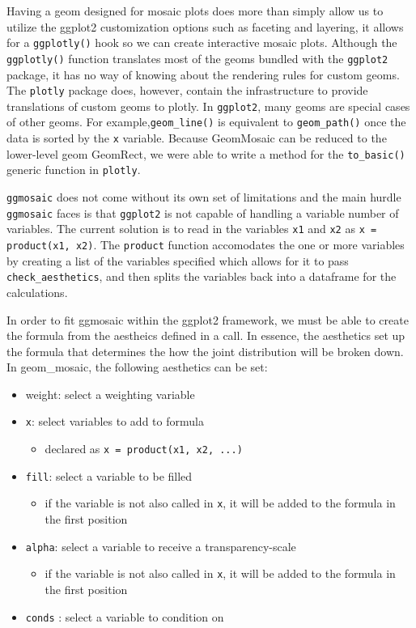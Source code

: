 Having a geom designed for mosaic plots does more than simply allow us
to utilize the ggplot2 customization options such as faceting and
layering, it allows for a \texttt{ggplotly()} hook so we can create
interactive mosaic plots. Although the \texttt{ggplotly()} function
translates most of the geoms bundled with the \texttt{ggplot2} package,
it has no way of knowing about the rendering rules for custom geoms. The
\texttt{plotly} package does, however, contain the infrastructure to
provide translations of custom geoms to plotly. In \texttt{ggplot2},
many geoms are special cases of other geoms. For
example,\texttt{geom\_line()} is equivalent to \texttt{geom\_path()}
once the data is sorted by the \texttt{x} variable. \citet{carson}
Because GeomMosaic can be reduced to the lower-level geom GeomRect, we
were able to write a method for the \texttt{to\_basic()} generic
function in \texttt{plotly}.

\texttt{ggmosaic} does not come without its own set of limitations and
the main hurdle \texttt{ggmosaic} faces is that \texttt{ggplot2} is not
capable of handling a variable number of variables. The current solution
is to read in the variables \texttt{x1} and \texttt{x2} as
\texttt{x = product(x1, x2)}. The \texttt{product} function accomodates
the one or more variables by creating a list of the variables specified
which allows for it to pass \texttt{check\_aesthetics}, and then splits
the variables back into a dataframe for the calculations.

In order to fit ggmosaic within the ggplot2 framework, we must be able
to create the formula from the aestheics defined in a call. In essence,
the aesthetics set up the formula that determines the how the joint
distribution will be broken down. In geom\_mosaic, the following
aesthetics can be set:

\begin{itemize}
\item weight: select a weighting variable
\item \texttt{x}: select variables to add to formula
    \begin{itemize}
    \item declared as \texttt{x = product(x1, x2, ...)}
    \end{itemize}
\item \texttt{fill}: select a variable to be filled
    \begin{itemize}
    \item if the variable is not also called in \texttt{x}, it will be added to the formula in the first position
    \end{itemize}
\item \texttt{alpha}: select a variable to receive a transparency-scale
    \begin{itemize}
    \item if the variable is not also called in \texttt{x}, it will be added to the formula in the first position
    \end{itemize}    
\item \texttt{conds} : select a variable to condition on
\end{itemize}

